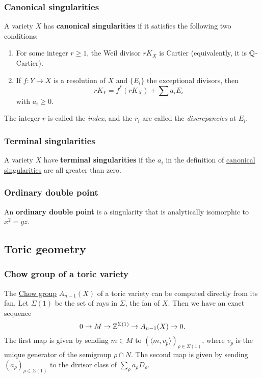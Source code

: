 \documentclass[11pt, english]{article}
\begin{document}
\subsubsection{Canonical singularities}
\label{canonicalsings}
A variety $X$ has \textbf{canonical singularities} if it satisfies the following two conditions:
\begin{enumerate}
\item For some integer $r \geq 1$, the Weil divisor $r K_X$ is Cartier (equivalently, it is $\mathbb{Q}$-Cartier).
\item If $f:Y \to X$ is a resolution of $X$ and $\{E_i \}$ the exceptional divisors, then
\[
r K_Y = f^\ast(rK_X) + \sum a_i E_i
\]
with $a_i \geq 0$.
\end{enumerate}
The integer $r$ is called the \emph{index}, and the $r_i$ are called the \emph{discrepancies} at $E_i$.

\subsubsection{Terminal singularities}
\label{terminalsings}

A variety $X$ have \textbf{terminal singularities} if the $a_i$ in the definition of \hyperref[canonicalsings]{canonical singularities} are all greater than zero.

\subsubsection{Ordinary double point}
\label{orddoublepoint}

An \textbf{ordinary double point} is a singularity that is analytically isomorphic to $x^2=yz$.

\subsection{Toric geometry}

\subsubsection{Chow group of a toric variety}
\label{chowtoric}

The \hyperref[chowgroup]{Chow group} $A_{n-1}(X)$ of a toric variety can be computed directly from its fan. Let $\Sigma(1)$ be the set of rays in $\Sigma$, the fan of $X$. Then we have an exact sequence
\[
 0 \to M \to \mathbb{Z}^{\Sigma(1)} \to A_{n-1}(X) \to 0.
\] 
The first map is given by sending $m \in M$ to $(\langle m,v_p \rangle )_{\rho \in \Sigma(1)}$, where $v_p$ is the unique generator of the semigroup $\rho \cap N$. The second map is given by sending $(a_\rho)_{\rho \in \Sigma(1)}$ to the divisor class of $\sum_\rho  a_\rho D_\rho$. 
\end{document}
